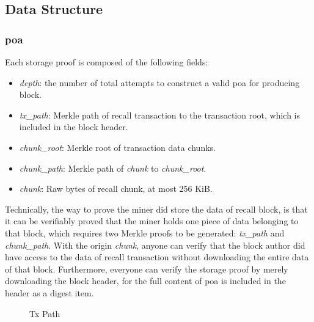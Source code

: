 \documentclass[]{article}
\begin{document}
\subsection{Data Structure}

\subsubsection{poa}\label{poa}

Each storage proof is composed of the following fields:

\begin{itemize}
    \item \textit{depth}: the number of total attempts to construct a valid poa for producing block.
    \item \textit{tx\_path}: Merkle path of recall transaction to the transaction root, which is included in the block header.
    \item \textit{chunk\_root}: Merkle root of transaction data chunks.
    \item \textit{chunk\_path}: Merkle path of \textit{chunk} to \textit{chunk\_root}.
    \item \textit{chunk}: Raw bytes of recall chunk, at most 256 KiB.
\end{itemize}

Technically, the way to prove the miner did store the data of recall block, is that it can be verifiably proved that the miner holds one piece of data belonging to that block, which requires two Merkle proofs to be generated: \textit{tx\_path} and \textit{chunk\_path}. With the origin \textit{chunk}, anyone can verify that the block author did have access to the data of recall transaction without downloading the entire data of that block. Furthermore, everyone can verify the storage proof by merely downloading the block header, for the full content of poa is included in the header as a digest item.

\begin{figure}
\caption{Tx Path}
\end{figure}
\end{document}
